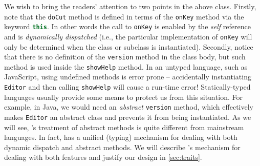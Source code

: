 We wish to bring the readers' attention to two points in the above class.
Firstly, note that the \lstinline{doCut} method is defined in terms of the
\lstinline{onKey} method via the keyword
\lstinline[language=JavaScript]{this}. In other words the call to
\lstinline{onKey} is enabled by the \emph{self} reference and is
\emph{dynamically dispatched} (i.e., the particular implementation of
\lstinline{onKey} will only be determined when the class or subclass
is instantiated). %
Secondly, notice that there is no definition of
the \lstinline{version} method in the class body, but such method is used inside the
\lstinline{showHelp} method. In an untyped language, such as JavaScript, using
undefined methods is error prone -- accidentally instantiating \lstinline{Editor}
and then calling \lstinline{showHelp} will cause a run-time error!
Statically-typed languages usually provide some means to protect us from this
situation. For example, in Java, we would need an \textit{abstract} \lstinline{version}
method, which effectively makes \lstinline{Editor} an abstract class and
prevents it from being instantiated. As we will see, \sedel's treatment of
abstract methods is quite different from mainstream languages. In fact, \sedel
has a unified (typing) mechanism for dealing with both dynamic dispatch and abstract
methods. We will describe \sedel's mechanism for dealing with both features and
justify our design in \cref{sec:traits}.



